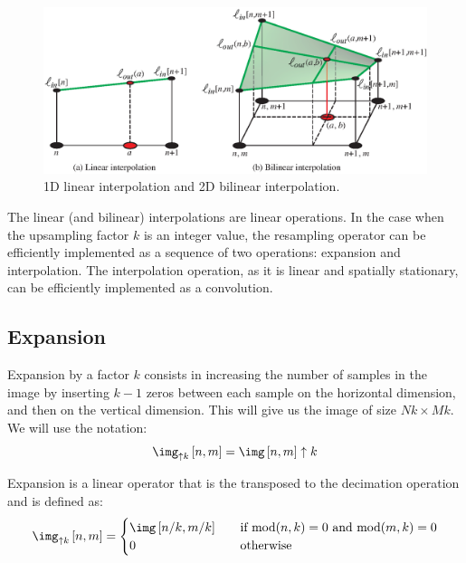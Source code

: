 \begin{figure}[h!]
\centerline{
\includegraphics[width=1\linewidth]{figures/upsamplig_downsampling/bilinear_interp2.eps}
}
\caption{1D linear interpolation and 2D bilinear interpolation.}
\label{fig:bilinear_interp}
\end{figure}

The linear (and bilinear) interpolations are linear operations. In the case when the upsampling factor $k$ is an integer value, the resampling operator can be efficiently implemented as a sequence of two operations: expansion and interpolation. The interpolation operation, as it is linear and spatially stationary, can be efficiently implemented as a convolution.


\subsection{Expansion}

Expansion by a factor $k$ consists in increasing the number of samples in the image by inserting $k-1$ zeros between each sample on the horizontal dimension, and then on the vertical dimension. This will give us the image of size $Nk \times Mk$. We will use the notation:
\begin{equation}
\img_{\uparrow k} \left[n,m\right]  = \img\left[n,m\right] \uparrow k 
\end{equation}

Expansion is a linear operator that is the transposed to the decimation operation and is defined as:
\begin{equation}
\img_{\uparrow k} \left[n,m\right] = 
 \begin{cases}
    \img \left[n/k,m/k\right]     & \quad \text{if~} \text{mod} (n,k)=0 \text{~and~} \text{mod} (m,k)=0\\
    0       & \quad \text{otherwise }\\
  \end{cases}
\label{eq:upzeros}
\end{equation}

